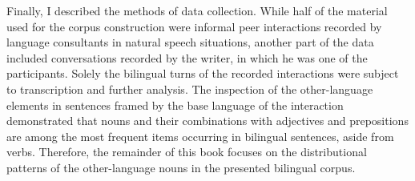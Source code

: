 Finally, I described the methods of data collection. While half of the material used for the corpus construction were informal peer interactions recorded by language consultants in natural speech situations, another part of the data included conversations recorded by the writer, in which he was one of the participants. Solely the bilingual turns of the recorded interactions were subject to transcription and further analysis. The inspection of the other-language elements in sentences framed by the base language of the interaction demonstrated that nouns and their combinations with adjectives and prepositions are among the most frequent items occurring in bilingual sentences, aside from verbs. Therefore, the remainder of this book focuses on the distributional patterns of the other-language nouns in the presented bilingual corpus.

